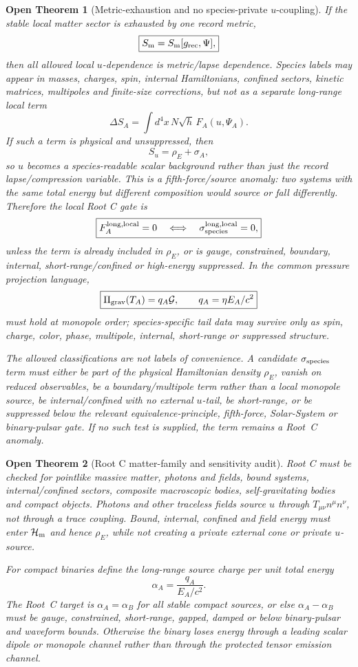 \documentclass[11pt]{article}
\newtheorem{openthm}{Open Theorem}
\begin{document}
\begin{openthm}[Metric-exhaustion and no species-private \(u\)-coupling]
If the stable local matter sector is exhausted by one record metric,
\[
\boxed{
S_{\rm m}=S_{\rm m}[g_{\rm rec},\Psi],
}
\]
then all allowed local \(u\)-dependence is metric/lapse dependence.  Species
labels may appear in masses, charges, spin, internal Hamiltonians, confined
sectors, kinetic matrices, multipoles and finite-size corrections, but not as
a separate long-range local term
\[
\boxed{
\Delta S_A
=
\int d^4x\,N\sqrt h\,F_A(u,\Psi_A).
}
\]
If such a term is physical and unsuppressed, then
\[
\boxed{
S_u=\rho_E+\sigma_A,
}
\]
so \(u\) becomes a species-readable scalar background rather than just the
record lapse/compression variable.  This is a fifth-force/source anomaly: two
systems with the same total energy but different composition would source or
fall differently.  Therefore the local Root C gate is
\[
\boxed{
F_A^{\rm long,local}=0
\quad\Longleftrightarrow\quad
\sigma_{\rm species}^{\rm long,local}=0,
}
\]
unless the term is already included in \(\rho_E\), or is gauge, constrained,
boundary, internal, short-range/confined or high-energy suppressed.  In the
common pressure projection language,
\[
\boxed{
\Pi_{\rm grav}(T_A)=q_A\mathcal G,
\qquad
q_A=\eta E_A/c^2
}
\]
must hold at monopole order; species-specific tail data may survive only as
spin, charge, color, phase, multipole, internal, short-range or suppressed
structure.

The allowed classifications are not labels of convenience.  A candidate
\(\sigma_{\rm species}\) term must either be part of the physical Hamiltonian
density \(\rho_E\), vanish on reduced observables, be a boundary/multipole
term rather than a local monopole source, be internal/confined with no
external \(u\)-tail, be short-range, or be suppressed below the relevant
equivalence-principle, fifth-force, Solar-System or binary-pulsar gate.  If no
such test is supplied, the term remains a Root~C anomaly.
\end{openthm}

\begin{openthm}[Root C matter-family and sensitivity audit]
Root C must be checked for pointlike massive matter, photons and fields, bound
systems, internal/confined sectors, composite macroscopic bodies,
self-gravitating bodies and compact objects.  Photons and other traceless
fields source \(u\) through \(T_{\mu\nu}n^\mu n^\nu\), not through a trace
coupling.  Bound, internal, confined and field energy must enter
\(\mathcal H_{\rm m}\) and hence \(\rho_E\), while not creating a private
external cone or private \(u\)-source.

For compact binaries define the long-range source charge per unit total
energy
\[
\boxed{
\alpha_A=\frac{q_A}{E_A/c^2}.
}
\]
The Root~C target is \(\alpha_A=\alpha_B\) for all stable compact sources, or
else \(\alpha_A-\alpha_B\) must be gauge, constrained, short-range, gapped,
damped or below binary-pulsar and waveform bounds.  Otherwise the binary loses
energy through a leading scalar dipole or monopole channel rather than through
the protected tensor emission channel.
\end{openthm}
\end{document}
